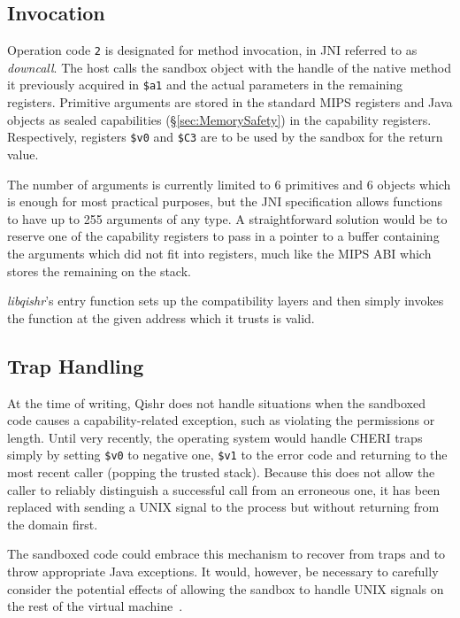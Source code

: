 \documentclass[a4paper,12pt,twoside,openright]{report}
\newcommand{\reg}[1]{\texttt{\$#1}}
\newcommand{\tool}[1]{\emph{#1}}
\newcommand{\lib}[1]{\tool{lib#1}}
\begin{document}
\subsection{Invocation}

Operation code \texttt{2} is designated for method invocation, in JNI referred to as \emph{downcall}. The host calls the sandbox object with the handle of the native method it previously acquired in \reg{a1} and the actual parameters in the remaining registers. Primitive arguments are stored in the standard MIPS registers and Java objects as sealed capabilities (\S\ref{sec:MemorySafety}) in the capability registers. Respectively, registers \reg{v0} and \reg{C3} are to be used by the sandbox for the return value.

The number of arguments is currently limited to 6 primitives and 6 objects which is enough for most practical purposes, but the JNI specification allows functions to have up to 255 arguments of any type. A straightforward solution would be to reserve one of the capability registers to pass in a pointer to a buffer containing the arguments which did not fit into registers, much like the MIPS ABI which stores the remaining on the stack.

\lib{qishr}'s entry function sets up the compatibility layers and then simply invokes the function at the given address which it trusts is valid. 

\subsection{Trap Handling}

At the time of writing, Qishr does not handle situations when the sandboxed code causes a capability-related exception, such as violating the permissions or length. Until very recently, the operating system would handle CHERI traps simply by setting \reg{v0} to negative one, \reg{v1} to the error code and returning to the most recent caller (popping the trusted stack). Because this does not allow the caller to reliably distinguish a successful call from an erroneous one, it has been replaced with sending a UNIX signal to the process but without returning from the domain first.

The sandboxed code could embrace this mechanism to recover from traps and to throw appropriate Java exceptions. It would, however, be necessary to carefully consider the potential effects of allowing the sandbox to handle UNIX signals on the rest of the virtual machine~\cite{989483}.
\end{document}
